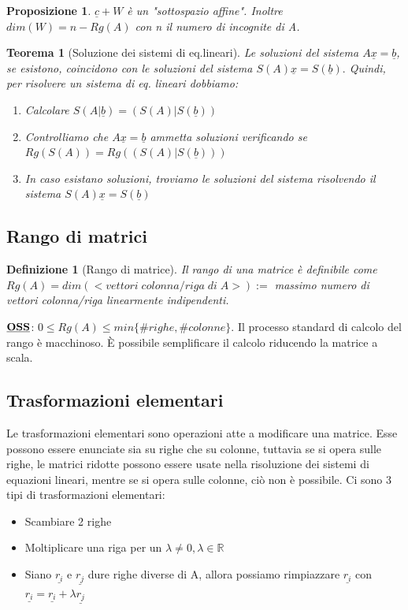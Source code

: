 \documentclass[12pt]{article}
\newenvironment{para}{\begin{adjustwidth}{13mm}{}}{\end{adjustwidth}}
\newtheorem{Definizione}{Definizione}[subsection]
\newtheorem{Teorema}{Teorema}[subsection]
\newtheorem{Proposizione}{Proposizione}[subsection]
\begin{document}
\begin{para}
\begin{Proposizione}
    $\underline{c}+W$ è un "sottospazio affine". \newline Inoltre $dim(W)=n-Rg(A)$ con n il numero di incognite di A.
\end{Proposizione}
\newpage
\begin{Teorema}[Soluzione dei sistemi di eq.lineari]
Le soluzioni del sistema $A\underline{x} = \underline{b}$, se esistono, coincidono con le soluzioni del sistema $S(A)\underline{x} = S(\underline{b}).$ Quindi, per risolvere un sistema di eq. lineari dobbiamo:
\begin{enumerate}
    \item Calcolare $S(A|\underline{b}) = (S(A)|S(\underline{b}))$
    \item Controlliamo che $A\underline{x} = \underline{b}$ ammetta soluzioni verificando se $Rg(S(A)) = Rg((S(A)|S(\underline{b})))$
    \item In caso esistano soluzioni, troviamo le soluzioni del sistema risolvendo il sistema $S(A)\underline{x} = S(\underline{b})$
\end{enumerate}
\end{Teorema}


\subsection{Rango di matrici}
\begin{Definizione}[Rango di matrice]
Il rango di una matrice è definibile come \newline $Rg(A) = dim(<vettori \; colonna/riga \; di \; A>) :=$ massimo numero di vettori colonna/riga linearmente indipendenti.
\end{Definizione}
$\bold{\underline{OSS}}$: $0 \leq Rg(A) \leq min\{\#righe, \#colonne\}$. \newline Il processo standard di calcolo del rango è macchinoso. È possibile semplificare il calcolo riducendo la matrice a scala.

\subsection{Trasformazioni elementari}
Le trasformazioni elementari sono operazioni atte a modificare una matrice. Esse possono essere enunciate sia su righe che su colonne, tuttavia se si opera sulle righe, le matrici ridotte possono essere usate nella risoluzione dei sistemi di equazioni lineari, mentre se si opera sulle colonne, ciò non è possibile. Ci sono 3 tipi di trasformazioni elementari:
\begin{itemize}
    \item Scambiare 2 righe
    \item Moltiplicare una riga per un $\lambda \neq 0, \lambda \in \mathbb{R}$
    \item Siano $\underline{r_i}$ e $\underline{r_j}$ dure righe diverse di A, allora possiamo rimpiazzare $\underline{r_i}$ con $\underline{r_i} = \underline{r_i} + \lambda \underline{r_j}$
\end{itemize}


\end{para}
\end{document}
